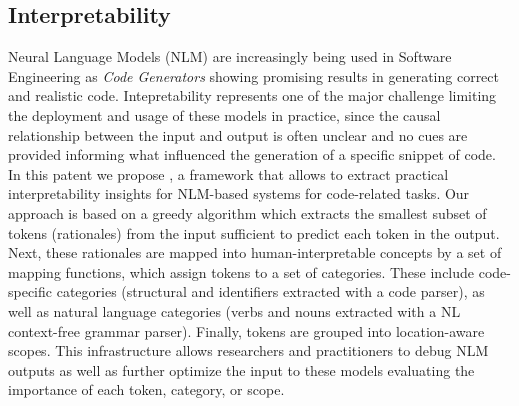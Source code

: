 \subsection{Interpretability}
Neural Language Models (NLM) are increasingly being used in Software Engineering as \textit{Code Generators} showing promising results in generating correct and realistic code. Intepretability represents one of the major challenge limiting the deployment and usage of these models in practice, since the causal relationship between the input and output is often unclear and no cues are provided informing what influenced the generation of a specific snippet of code. In this patent we propose \codeSeqRational, a framework that allows to extract practical interpretability insights for NLM-based systems for code-related tasks. Our approach is based on a greedy algorithm which extracts the smallest subset of tokens (rationales) from the input sufficient to predict each token in the output. Next, these rationales are mapped into human-interpretable concepts by a set of mapping functions, which assign tokens to a set of categories. These include code-specific categories (\ie structural and identifiers extracted with a code parser), as well as natural language categories (\eg verbs and nouns extracted with a NL context-free grammar parser). Finally, tokens are grouped into location-aware scopes. This infrastructure allows researchers and practitioners to debug NLM outputs as well as further optimize the input to these models evaluating the importance of each token, category, or scope.